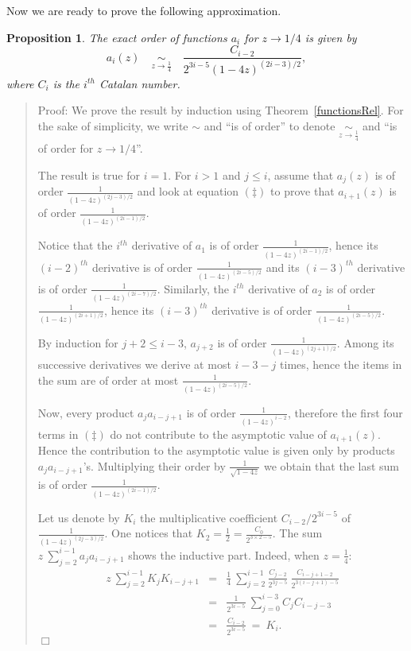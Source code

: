 \documentclass{jfp1}
\newenvironment{proof}[1]{\begin{quotation}\noindent\textsf{Proof:} #1}
{\(\Box\)\end{quotation}}
\newtheorem{prop}[theo]{Proposition}
\newcommand\subrel[2]{\mathrel{\mathop{#2}\limits_{#1}}}
\begin{document}
Now we are ready to prove the following approximation.
\begin{prop}\label{prop:equiv}
The exact order of functions $a_i$ for $z \to 1/4$ is given by
  \begin{displaymath}
  a_i(z) \quad \subrel{z \to \frac{1}{4}}{\sim} \quad \frac{C_{i-2}}{2^{3i-5}(1-4z)^{(2i-3)/2}},
\end{displaymath}
where $C_i$ is the $i^{th}$ Catalan number.
\end{prop}
\begin{proof}
We prove the result by induction using Theorem~\ref{functionsRel}. For the sake of simplicity, we write $\sim$ and ``is of order'' to denote $\subrel{z \to \frac{1}{4}}{\sim}$ and ``is of order for $z \to 1/4$''.

The result is true for $i=1$. For $i>1$ and $j\le i$,  assume that $a_j(z)$ is of order $\frac{1}{(1-4z)^{(2j-3)/2}}$ and look at
  equation $(\ddagger)$ to prove that  $a_{i+1}(z)$ is of order $\frac{1}{(1-4z)^{(2i-1)/2}}$.

  Notice that the $i^{th}$ derivative of $a_1$ is of order
  $\frac{1}{(1-4z)^{(2i-1)/2}}$, hence its $(i-2)^{th}$ derivative is of order
  $\frac{1}{(1-4z)^{(2i-5)/2}}$ and its $(i-3)^{th}$ derivative is of order
  $\frac{1}{(1-4z)^{(2i-7)/2}}$.  Similarly, the $i^{th}$ derivative of $a_2$ is of
  order $\frac{1}{(1-4z)^{(2i+1)/2}}$, hence its $(i-3)^{th}$ derivative is of order
  $\frac{1}{(1-4z)^{(2i-5)/2}}$.

  By induction for $j+2\le i-3$,  $a_{j+2}$ is of order $\frac{1}{(1-4z)^{(2j+1)/2}}$.
  Among its successive derivatives we derive at most $i-3-j$ times, hence the
  items in the sum are of order at most $\frac{1}{(1-4z)^{(2i-5)/2}}$.

  Now, every product $a_j a_{i-j+1}$ is of order $\frac{1}{(1-4z)^{i-2}}$, therefore the first four terms in $(\ddagger)$ do not
  contribute to the asymptotic value of $a_{i+1}(z)$.  Hence the contribution to the asymptotic value is given only by products $a_j a_{i-j+1}$'s. Multiplying their order by $\frac{1}{\sqrt{1-4z}}$ we obtain that the last sum is of order $\frac{1}{(1-4z)^{(2i-1)/2}}$.

    Let us denote by $K_i$ the multiplicative coefficient $C_{i-2}/2^{3i-5}$ of $\frac{1}{(1-4z)^{(2j-3)/2}}$.
    One notices that $K_2= \frac{1}{2} = \frac{C_0}{2^{3\times 2-5}}$.  The sum
    $z~\sum_{j=2}^{i-1} a_j a_{i-j+1}$ shows the inductive part.  Indeed, when
    $z=\frac{1}{4}$:
\begin{eqnarray*}
  z~\sum_{j=2}^{i-1} K_j K_{i-j+1} &=&
  \frac{1}{4} ~\sum_{j=2}^{i-1} \frac{C_{j-2}}{2^{3j-5}}\ \frac{C_{i-j+1-2}}{2^{3(i-j+1)-5}} \\
&=& \frac{1}{2^{3i-5}} \ \sum_{j=0}^{i-3} C_{j} C_{i-j-3}\\
&=& \frac{C_{i-2} }{2^{3i-5}} \ = \ K_i.
\end{eqnarray*}
\end{proof}
\end{document}
